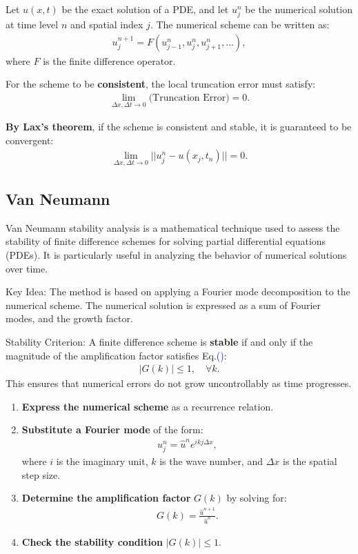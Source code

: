 \documentclass[fleqn,10pt]{SelfArx} %
\newcommand{\myeqref}[1]{Eq.\textcolor{blue}{\textup{(\getrefnumber{#1})}}}
\begin{document}
Let \( u(x,t) \) be the exact solution of a PDE, and let \( u^n_j \) be the numerical solution at time level \( n \) and spatial index \( j \). The numerical scheme can be written as:
\begin{align*}
    u^{n+1}_j = F(u^n_{j-1}, u^n_j, u^n_{j+1}, \dots),
\end{align*}
where \( F \) is the finite difference operator.

For the scheme to be \textbf{consistent}, the local truncation error must satisfy:
\begin{align*}
    \lim_{\Delta x, \Delta t \to 0} \text{(Truncation Error)} = 0.
\end{align*}

\textbf{By Lax's theorem}, if the scheme is consistent and stable, it is guaranteed to be convergent:
\begin{align*}
    \lim_{\Delta x, \Delta t \to 0} || u^n_j - u(x_j, t_n) || = 0.
\end{align*}

\subsection{Van Neumann}
Van Neumann stability analysis is a mathematical technique used to assess the stability of finite difference schemes for solving partial differential equations (PDEs). It is particularly useful in analyzing the behavior of numerical solutions over time.

Key Idea: The method is based on applying a Fourier mode decomposition to the numerical scheme. The numerical solution is expressed as a sum of Fourier modes, and the growth factor.

Stability Criterion: A finite difference scheme is \textbf{stable} if and only if the magnitude of the amplification factor satisfies \myeqref{eq:vanneumann}:
\begin{align*}
	|G(k)| \leq 1, \quad \forall k. \tag{10.1} \label{eq:vanneumann}
\end{align*}
This ensures that numerical errors do not grow uncontrollably as time progresses.

\begin{enumerate}[noitemsep]
    \item \textbf{Express the numerical scheme} as a recurrence relation.
    \item \textbf{Substitute a Fourier mode} of the form:
    \begin{align*}
        u^n_j = \hat{u}^n e^{i k j \Delta x},
    \end{align*}
    where \( i \) is the imaginary unit, \( k \) is the wave number, and \( \Delta x \) is the spatial step size.
    \item \textbf{Determine the amplification factor} \( G(k) \) by solving for:
    \begin{align*}
        G(k) = \frac{\hat{u}^{n+1}}{\hat{u}^n}.
    \end{align*}
    \item \textbf{Check the stability condition} \( |G(k)| \leq 1 \).
\end{enumerate}
\end{document}
